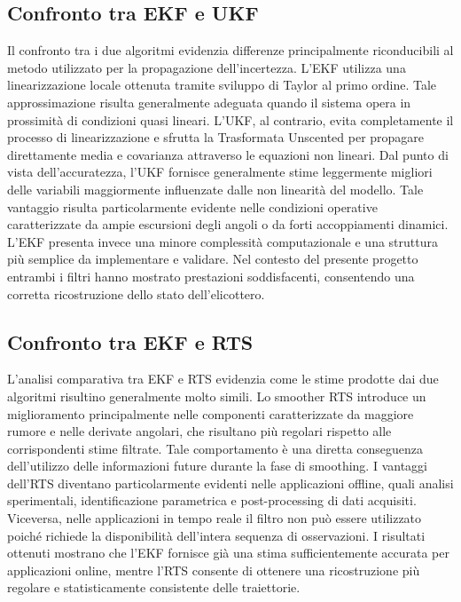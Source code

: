 \documentclass[12pt,a4paper]{article}
\begin{document}
\subsection{Confronto tra EKF e UKF}
Il confronto tra i due algoritmi evidenzia differenze principalmente riconducibili al metodo utilizzato per la propagazione dell'incertezza.
L'EKF utilizza una linearizzazione locale ottenuta tramite sviluppo di Taylor al primo ordine. Tale approssimazione risulta generalmente adeguata quando il sistema opera in prossimità di condizioni quasi lineari.
L'UKF, al contrario, evita completamente il processo di linearizzazione e sfrutta la Trasformata Unscented per propagare direttamente media e covarianza attraverso le equazioni non lineari.
Dal punto di vista dell'accuratezza, l'UKF fornisce generalmente stime leggermente migliori delle variabili maggiormente influenzate dalle non linearità del modello. Tale vantaggio risulta particolarmente evidente nelle condizioni operative caratterizzate da ampie escursioni degli angoli o da forti accoppiamenti dinamici.
L'EKF presenta invece una minore complessità computazionale e una struttura più semplice da implementare e validare.
Nel contesto del presente progetto entrambi i filtri hanno mostrato prestazioni soddisfacenti, consentendo una corretta ricostruzione dello stato dell'elicottero.


\subsection{Confronto tra EKF e RTS}
L'analisi comparativa tra EKF e RTS evidenzia come le stime prodotte dai due algoritmi risultino generalmente molto simili.
Lo smoother RTS introduce un miglioramento principalmente nelle componenti caratterizzate da maggiore rumore e nelle derivate angolari, che risultano più regolari rispetto alle corrispondenti stime filtrate.
Tale comportamento è una diretta conseguenza dell'utilizzo delle informazioni future durante la fase di smoothing.
I vantaggi dell'RTS diventano particolarmente evidenti nelle applicazioni offline, quali analisi sperimentali, identificazione parametrica e post-processing di dati acquisiti.
Viceversa, nelle applicazioni in tempo reale il filtro non può essere utilizzato poiché richiede la disponibilità dell'intera sequenza di osservazioni.
I risultati ottenuti mostrano che l'EKF fornisce già una stima sufficientemente accurata per applicazioni online, mentre l'RTS consente di ottenere una ricostruzione più regolare e statisticamente consistente delle traiettorie.
\end{document}

